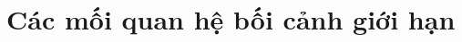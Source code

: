 \documentclass{report} %
\begin{document}




% 


% 


% 


% 
% 
\section{Các mối quan hệ bối cảnh giới hạn}


% 
% 
\end{document}

